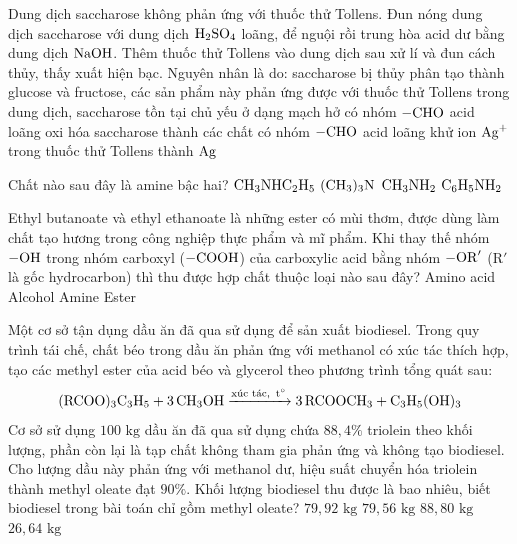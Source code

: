 \documentclass[11pt,a4paper]{article}
\begin{document}
\begin{ex}
Dung dịch saccharose không phản ứng với thuốc thử Tollens. Đun nóng dung dịch saccharose với dung dịch $\ce{H2SO4}$ loãng, để nguội rồi trung hòa acid dư bằng dung dịch $\ce{NaOH}$. Thêm thuốc thử Tollens vào dung dịch sau xử lí và đun cách thủy, thấy xuất hiện bạc. Nguyên nhân là do:
\choice
{\True saccharose bị thủy phân tạo thành glucose và fructose, các sản phẩm này phản ứng được với thuốc thử Tollens}
{trong dung dịch, saccharose tồn tại chủ yếu ở dạng mạch hở có nhóm $\ce{-CHO}$}
{acid loãng oxi hóa saccharose thành các chất có nhóm $\ce{-CHO}$}
{acid loãng khử ion $\ce{Ag+}$ trong thuốc thử Tollens thành $\ce{Ag}$}

\end{ex}

\begin{ex}
Chất nào sau đây là amine bậc hai?
\choice
{\True $\ce{CH3NHC2H5}$}
{$\ce{(CH3)3N}$}
{$\ce{CH3NH2}$}
{$\ce{C6H5NH2}$}

\end{ex}

\begin{ex}
Ethyl butanoate và ethyl ethanoate là những ester có mùi thơm, được dùng làm chất tạo hương trong công nghiệp thực phẩm và mĩ phẩm. Khi thay thế nhóm $\ce{-OH}$ trong nhóm carboxyl ($\ce{-COOH}$) của carboxylic acid bằng nhóm $-\ce{OR}'$ ($\text{R}'$ là gốc hydrocarbon) thì thu được hợp chất thuộc loại nào sau đây?
\choice
{Amino acid}
{Alcohol}
{Amine}
{\True Ester}

\end{ex}

\begin{ex}
Một cơ sở tận dụng dầu ăn đã qua sử dụng để sản xuất biodiesel. Trong quy trình tái chế, chất béo trong dầu ăn phản ứng với methanol có xúc tác thích hợp, tạo các methyl ester của acid béo và glycerol theo phương trình tổng quát sau:
\[ \ce{(RCOO)3C3H5 + 3CH3OH ->[\text{xúc tác},\, t^\circ] 3RCOOCH3 + C3H5(OH)3} \]
Cơ sở sử dụng $100\text{ kg}$ dầu ăn đã qua sử dụng chứa $88{,}4\%$ triolein theo khối lượng, phần còn lại là tạp chất không tham gia phản ứng và không tạo biodiesel. Cho lượng dầu này phản ứng với methanol dư, hiệu suất chuyển hóa triolein thành methyl oleate đạt $90\%$. Khối lượng biodiesel thu được là bao nhiêu, biết biodiesel trong bài toán chỉ gồm methyl oleate?
\choice
{\True $79{,}92\text{ kg}$}
{$79{,}56\text{ kg}$}
{$88{,}80\text{ kg}$}
{$26{,}64\text{ kg}$}

\end{ex}
\end{document}
